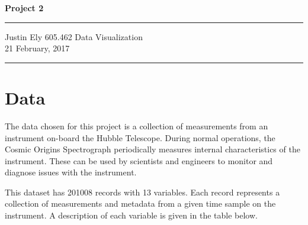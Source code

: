 \documentclass[a4paper,11pt]{article}
\begin{document}
\begin{flushright}

\vspace{1.1cm}

{\bf\Huge Project 2}

\rule{0.25\linewidth}{0.5pt}

\vspace{0.5cm}
Justin Ely
\linebreak
\newline
\footnotesize{605.462 Data Visualization \\}
\vspace{0.5cm}
21 February, 2017
\end{flushright}

\noindent\rule{\linewidth}{1.0pt}


\section{Data}
The data chosen for this project is a collection of measurements from an instrument on-board the Hubble Telescope.  During normal operations, the Cosmic Origins Spectrograph periodically measures internal characteristics of the instrument.  These can be used by scientists and engineers to monitor and diagnose issues with the instrument.  

This dataset has 201008 records with 13 variables.  Each record represents a collection of measurements and metadata from a given time sample on the instrument.  A description of each variable is given in the table below.
\end{document}
